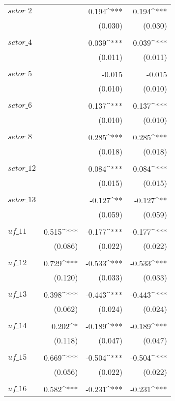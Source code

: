 \begin{apendicesenv}
\begin{footnotesize}
\begin{longtable}{@{\extracolsep{5pt}}lD{.}{.}{-3} D{.}{.}{-3} D{.}{.}{-3} }
	   $setor\_2$ &  & 0.194^{***} & 0.194^{***} \\ 
		&  & (0.030) & (0.030) \\
		& & & \\
	   $setor\_4$ &  & 0.039^{***} & 0.039^{***} \\
		&  & (0.011) & (0.011) \\
		& & & \\
	   $setor\_5$ &  & -0.015 & -0.015 \\
		&  & (0.010) & (0.010) \\
		& & & \\
	   $setor\_6$ &  & 0.137^{***} & 0.137^{***} \\
		&  & (0.010) & (0.010) \\ 
		& & & \\
	   $setor\_8$ &  & 0.285^{***} & 0.285^{***} \\
		&  & (0.018) & (0.018) \\
		& & & \\
	   $setor\_12$ &  & 0.084^{***} & 0.084^{***} \\
		&  & (0.015) & (0.015) \\
		& & & \\
	   $setor\_13$ &  & -0.127^{**} & -0.127^{**} \\
		&  & (0.059) & (0.059) \\
		& & & \\
	   $uf\_11$ & 0.515^{***} & -0.177^{***} & -0.177^{***} \\ 
		& (0.086) & (0.022) & (0.022) \\
		& & & \\
	   $uf\_12$ & 0.729^{***} & -0.533^{***} & -0.533^{***} \\
		& (0.120) & (0.033) & (0.033) \\
		& & & \\
	   $uf\_13$ & 0.398^{***} & -0.443^{***} & -0.443^{***} \\
		& (0.062) & (0.024) & (0.024) \\
		& & & \\
	   $uf\_14$ & 0.202^{*} & -0.189^{***} & -0.189^{***} \\
		& (0.118) & (0.047) & (0.047) \\ 
		& & & \\
	   $uf\_15$ & 0.669^{***} & -0.504^{***} & -0.504^{***} \\
		& (0.056) & (0.022) & (0.022) \\
		& & & \\
	   $uf\_16$ & 0.582^{***} & -0.231^{***} & -0.231^{***} \\

\end{longtable}
\end{footnotesize}
\end{apendicesenv}
